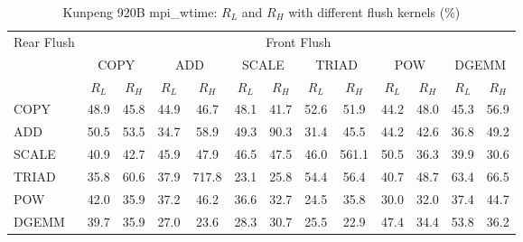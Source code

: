\begin{table}[htbp]
\centering
\caption{Kunpeng 920B mpi\_wtime: $R_L$ and $R_H$ with different flush kernels (\%)}
\label{tab:frkern-c920bn3-mpi_wtime}
\begin{tabular*}{\textwidth}{@{\extracolsep{\fill}}lcccccccccccc}
\toprule
\multirow{3}{*}{Rear Flush} & \multicolumn{12}{c}{Front Flush} \\ \cmidrule(lr){2-13}
& \multicolumn{2}{c}{COPY} & \multicolumn{2}{c}{ADD} & \multicolumn{2}{c}{SCALE} & \multicolumn{2}{c}{TRIAD} & \multicolumn{2}{c}{POW} & \multicolumn{2}{c}{DGEMM} \\ \cmidrule(lr){2-3} \cmidrule(lr){4-5} \cmidrule(lr){6-7} \cmidrule(lr){8-9} \cmidrule(lr){10-11} \cmidrule(lr){12-13}
& $R_L$ & $R_H$ & $R_L$ & $R_H$ & $R_L$ & $R_H$ & $R_L$ & $R_H$ & $R_L$ & $R_H$ & $R_L$ & $R_H$ \\ \midrule
COPY & 48.9 & 45.8 & 44.9 & 46.7 & 48.1 & 41.7 & 52.6 & 51.9 & 44.2 & 48.0 & 45.3 & 56.9 \\
ADD & 50.5 & 53.5 & 34.7 & 58.9 & 49.3 & 90.3 & 31.4 & 45.5 & 44.2 & 42.6 & 36.8 & 49.2 \\
SCALE & 40.9 & 42.7 & 45.9 & 47.9 & 46.5 & 47.5 & 46.0 & 561.1 & 50.5 & 36.3 & 39.9 & 30.6 \\
TRIAD & 35.8 & 60.6 & 37.9 & 717.8 & 23.1 & 25.8 & 54.4 & 56.4 & 40.7 & 48.7 & 63.4 & 66.5 \\
POW & 42.0 & 35.9 & 37.2 & 46.2 & 36.6 & 32.7 & 24.5 & 35.8 & 30.0 & 32.0 & 37.4 & 44.7 \\
DGEMM & 39.7 & 35.9 & 27.0 & 23.6 & 28.3 & 30.7 & 25.5 & 22.9 & 47.4 & 34.4 & 53.8 & 36.2 \\
\bottomrule
\end{tabular*}
\end{table}